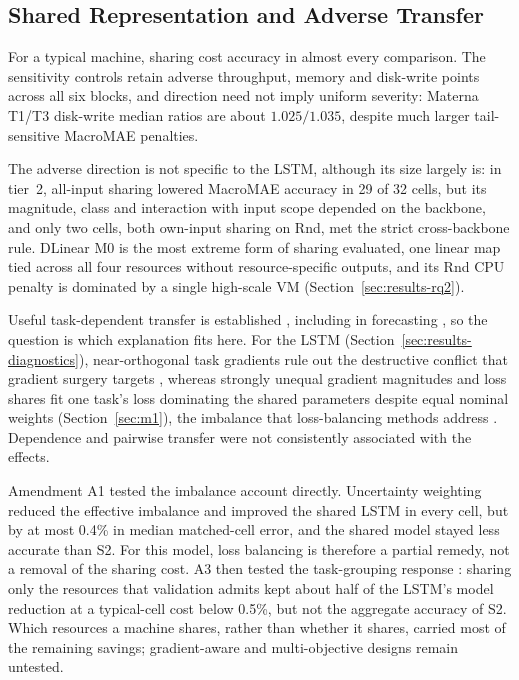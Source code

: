 \documentclass[5p,twocolumn]{elsarticle}
\begin{document}
\subsection{Shared Representation and Adverse Transfer}
\label{sec:discussion-sharing}

For a typical machine, sharing cost accuracy in almost every comparison. The
sensitivity controls retain adverse throughput, memory and disk-write points
across all six blocks, and direction need not imply uniform severity: Materna
T1/T3 disk-write median ratios are about $1.025/1.035$,
despite much larger tail-sensitive MacroMAE penalties.

The adverse direction is not specific to the LSTM, although its size
largely is: in tier~2, all-input sharing lowered MacroMAE accuracy in 29 of
32 cells, but its magnitude, class and interaction with input scope depended
on the backbone, and only two cells, both own-input sharing on Rnd, met the
strict cross-backbone rule. DLinear M0 is the most extreme
form of sharing evaluated, one linear map tied across all four resources
without resource-specific outputs, and its Rnd CPU penalty is dominated by a
single high-scale VM (Section~\ref{sec:results-rq2}).

Useful task-dependent transfer is established
\citep{Caruana1997Multitask,Standley2020TaskGrouping,Fifty2021TaskGroupings},
including in forecasting \citep{Nikentari2022NARMAXLSTM,Nochumsohn2025MTLinear},
so the question is which explanation fits here. For the LSTM
(Section~\ref{sec:results-diagnostics}), near-orthogonal task gradients rule
out the destructive conflict that gradient surgery targets
\citep{Yu2020GradientSurgery}, whereas strongly unequal gradient magnitudes
and loss shares fit one task's loss dominating the shared parameters despite
equal nominal weights (Section~\ref{sec:m1}), the imbalance that
loss-balancing methods address \citep{Chen2018GradNorm}. Dependence and
pairwise transfer were not consistently associated with the effects.

Amendment A1 tested the imbalance account directly. Uncertainty weighting
reduced the effective imbalance and improved the shared LSTM in every cell,
but by at most 0.4\% in median matched-cell error, and the shared model
stayed less accurate than S2. For this model, loss balancing is therefore a
partial remedy, not a removal of the sharing cost. A3 then tested the
task-grouping response \citep{Standley2020TaskGrouping,Fifty2021TaskGroupings}:
sharing only the resources that validation admits kept about half of the
LSTM's model reduction at a typical-cell cost below 0.5\%, but not the
aggregate accuracy of S2. Which resources a machine shares, rather than
whether it shares, carried most of the remaining savings; gradient-aware and
multi-objective designs \citep{Sener2018MultiObjective,Yu2020GradientSurgery}
remain untested.
\end{document}
